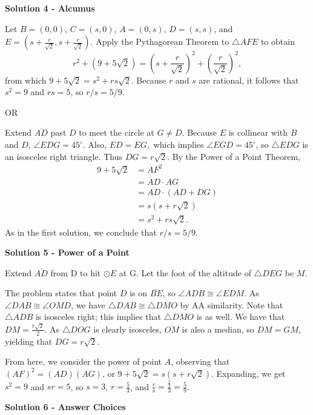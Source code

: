 \begin{enumerate}
\textbf{Solution 4 - Alcumus}

Let $B=(0,0)$, $C=(s,0)$, $A=(0,s)$, $D=(s,s)$, and $E=\left(s+\frac{r}{\sqrt{2}},s+\frac{r}{\sqrt{2}} \right)$. Apply the Pythagorean Theorem to $\triangle AFE$ to obtain 
 \[r^2+\left(9+5\sqrt{2}\right)=\left(s+\frac{r}{\sqrt{2}}\right)^2+\left(\frac{r}{\sqrt{2}}\right)^2,\] from which $9+5\sqrt{2}=s^2+rs\sqrt{2}$. Because $r$ and $s$ are rational, it follows that $s^2=9$ and $rs=5$, so $r/s = \boxed{5/9}$.

 OR

 Extend $\overline{AD}$ past $D$ to meet the circle at $G \ne D$. Because $E$ is collinear with $B$ and $D$, $\angle EDG = 45^\circ.$ Also, $ED = EG,$ which implies $\angle EGD = 45^\circ$, so $\triangle EDG$ is an isosceles right triangle. Thus $DG = r\sqrt{2}$. By the Power of a Point Theorem,
 \begin{align*} 9+5\sqrt{2} &= AF^2 \\ &= AD\cdot AG\\ & = AD\cdot \left(AD+DG\right) \\ &= s\left(s+r\sqrt{2}\right) \\ &= s^2+rs\sqrt{2}.\end{align*}
 As in the first solution, we conclude that $r/s=\boxed{5/9}$.

 



\textbf{Solution 5 - Power of a Point}

Extend $\overline{AD}$ from D to hit $\odot E$ at G. Let the foot of the altitude of $\triangle DEG$ be $M$.

 
The problem states that point $D$ is on $\overline{BE}$, so $\angle ADB \cong \angle EDM$. As $\angle DAB \cong \angle OMD$, we have $\triangle DAB \cong \triangle DMO$ by AA similarity. Note that $\triangle ADB$ is isosceles right; this implies that $\triangle DMO$ is as well. We have that $DM = \frac{ r \sqrt{2} }{2}$. As $\triangle DOG$ is clearly isosceles, $\overline{OM}$ is also a median, so $DM = GM$, yielding that $DG = r\sqrt{2}$.

 
From here, we consider the power of point $A$, observing that $(AF)^2 = (AD)(AG)$, or $9 + 5\sqrt{2} = s(s + r\sqrt{2} )$. Expanding, we get $s^2 = 9$ and $sr = 5$, so $s= 3$, $r = \frac{5}{3}$, and $\frac{r}{s} = \frac{ \frac{5}{3} }{3} = \frac{5}{9}$.

 



\textbf{Solution 6 - Answer Choices}


\end{enumerate}
